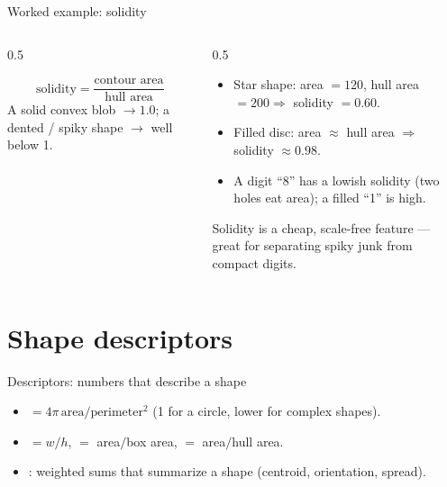 \documentclass[10pt,aspectratio=169]{beamer}
\begin{document}
\begin{frame}{Worked example: solidity}
  \begin{columns}[T]
    \begin{column}{0.5\textwidth}
      \begin{mathbox}[Solidity]
        \[ \text{solidity}=\frac{\text{contour area}}{\text{hull area}} \]
        A solid convex blob $\rightarrow 1.0$; a dented / spiky shape $\rightarrow$ well below 1.
      \end{mathbox}
    \end{column}
    \begin{column}{0.5\textwidth}
      \begin{itemize}\scriptsize
        \item Star shape: area $=120$, hull area $=200 \Rightarrow$ solidity $=0.60$.
        \item Filled disc: area $\approx$ hull area $\Rightarrow$ solidity $\approx 0.98$.
        \item A digit ``8'' has a lowish solidity (two holes eat area); a filled ``1'' is high.
      \end{itemize}
      \begin{goodbox}
        Solidity is a cheap, scale-free feature — great for separating spiky junk from compact digits.
      \end{goodbox}
    \end{column}
  \end{columns}
\end{frame}

\section{Shape descriptors}

\begin{frame}{Descriptors: numbers that describe a shape}
  \begin{itemize}
    \item {} $= 4\pi\,\mathrm{area}/\mathrm{perimeter}^2$ (1 for a circle, lower for complex shapes).
    \item {} $=w/h$,  $=$ area$/$box area,  $=$ area$/$hull area.
    \item {}: weighted sums that summarize a shape (centroid, orientation, spread).
  \end{itemize}
\end{frame}
\end{document}
